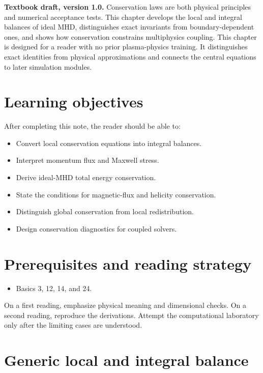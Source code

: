 \documentclass[11pt]{article}
\begin{document}

\begin{overviewbox}
\textbf{Textbook draft, version 1.0.} Conservation laws are both physical principles and numerical acceptance tests. This chapter develops the local and integral balances of ideal MHD, distinguishes exact invariants from boundary-dependent ones, and shows how conservation constrains multiphysics coupling. This chapter is designed for a reader with no prior plasma-physics training. It distinguishes exact identities from physical approximations and connects the central equations to later simulation modules.
\end{overviewbox}

\ProjectTOC

\section{Learning objectives}
After completing this note, the reader should be able to:
\begin{itemize}[leftmargin=1.6em]
\item Convert local conservation equations into integral balances.
\item Interpret momentum flux and Maxwell stress.
\item Derive ideal-MHD total energy conservation.
\item State the conditions for magnetic-flux and helicity conservation.
\item Distinguish global conservation from local redistribution.
\item Design conservation diagnostics for coupled solvers.
\end{itemize}

\section{Prerequisites and reading strategy}
\begin{itemize}[leftmargin=1.6em]
\item Basics 3, 12, 14, and 24.
\end{itemize}
On a first reading, emphasize physical meaning and dimensional checks. On a second reading, reproduce the derivations. Attempt the computational laboratory only after the limiting cases are understood.

\section{Generic local and integral balance}
\end{document}
